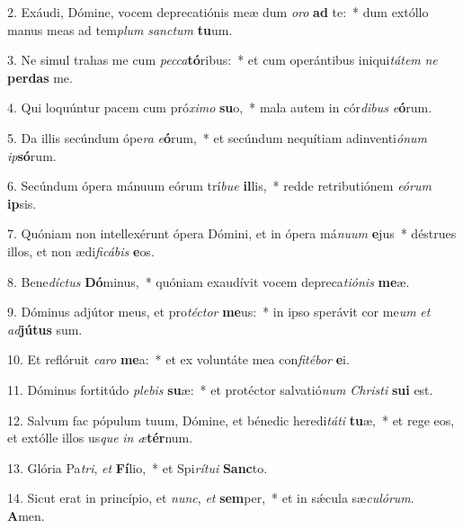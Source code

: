 2. Exáudi, Dómine, vocem deprecatiónis meæ dum \textit{o}\textit{ro} \textbf{ad} te:~*  dum extóllo manus meas ad tem\textit{plum} \textit{sanc}\textit{tum} \textbf{tu}um.\

3. Ne simul trahas me cum \textit{pec}\textit{ca}\textbf{tó}ribus:~*  et cum operántibus iniqui\textit{tá}\textit{tem} \textit{ne} \textbf{per}\textbf{das} me.\

4. Qui loquúntur pacem cum pró\textit{xi}\textit{mo} \textbf{su}o,~*  mala autem in cór\textit{di}\textit{bus} \textit{e}\textbf{ó}rum.\

5. Da illis secúndum ópe\textit{ra} \textit{e}\textbf{ó}rum,~*  et secúndum nequítiam adinventi\textit{ó}\textit{num} \textit{ip}\textbf{só}rum.\

6. Secúndum ópera mánuum eórum trí\textit{bu}\textit{e} \textbf{il}lis,~*  redde retributiónem \textit{e}\textit{ó}\textit{rum} \textbf{ip}sis.\

7. Quóniam non intellexérunt ópera Dómini, et in ópera má\textit{nu}\textit{um} \textbf{e}jus~*  déstrues illos, et non ædi\textit{fi}\textit{cá}\textit{bis} \textbf{e}os.\

8. Bene\textit{díc}\textit{tus} \textbf{Dó}minus,~*  quóniam exaudívit vocem depreca\textit{ti}\textit{ó}\textit{nis} \textbf{me}æ.\

9. Dóminus adjútor meus, et pro\textit{téc}\textit{tor} \textbf{me}us:~*  in ipso sperávit cor me\textit{um} \textit{et} \textit{ad}\textbf{jú}\textbf{tus} sum.\

10. Et reflóruit \textit{ca}\textit{ro} \textbf{me}a:~*  et ex voluntáte mea con\textit{fi}\textit{té}\textit{bor} \textbf{e}i.\

11. Dóminus fortitúdo \textit{ple}\textit{bis} \textbf{su}æ:~*  et protéctor salvatió\textit{num} \textit{Chris}\textit{ti} \textbf{su}\textbf{i} est.\

12. Salvum fac pópulum tuum, Dómine, et bénedic heredi\textit{tá}\textit{ti} \textbf{tu}æ,~*  et rege eos, et extólle illos us\textit{que} \textit{in} \textit{æ}\textbf{tér}num.\

13. Glória Pa\textit{tri}, \textit{et} \textbf{Fí}lio,~*  et Spi\textit{rí}\textit{tu}\textit{i} \textbf{Sanc}to.\

14. Sicut erat in princípio, et \textit{nunc}, \textit{et} \textbf{sem}per,~*  et in sǽcula sæ\textit{cu}\textit{ló}\textit{rum}. \textbf{A}men.\

